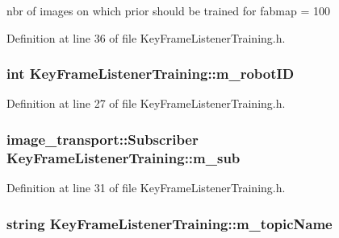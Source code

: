 nbr of images on which prior should be trained for fabmap = 100 



\-Definition at line 36 of file \-Key\-Frame\-Listener\-Training.\-h.

\hypertarget{classKeyFrameListenerTraining_ac4bc91c462f7cbf1364087c8c7177ee5}{
\subsubsection[{m\-\_\-robot\-I\-D}]{\setlength{\rightskip}{0pt plus 5cm}int {\bf \-Key\-Frame\-Listener\-Training\-::m\-\_\-robot\-I\-D}}}\label{classKeyFrameListenerTraining_ac4bc91c462f7cbf1364087c8c7177ee5}


\-Definition at line 27 of file \-Key\-Frame\-Listener\-Training.\-h.

\hypertarget{classKeyFrameListenerTraining_a3b368cdbbe4bbb92bf47a35d01d55644}{
\subsubsection[{m\-\_\-sub}]{\setlength{\rightskip}{0pt plus 5cm}image\-\_\-transport\-::\-Subscriber {\bf \-Key\-Frame\-Listener\-Training\-::m\-\_\-sub}}}\label{classKeyFrameListenerTraining_a3b368cdbbe4bbb92bf47a35d01d55644}


\-Definition at line 31 of file \-Key\-Frame\-Listener\-Training.\-h.

\hypertarget{classKeyFrameListenerTraining_aa6e0e60a43e678d54a90201c9ec34deb}{
\subsubsection[{m\-\_\-topic\-Name}]{\setlength{\rightskip}{0pt plus 5cm}string {\bf \-Key\-Frame\-Listener\-Training\-::m\-\_\-topic\-Name}}}\label{classKeyFrameListenerTraining_aa6e0e60a43e678d54a90201c9ec34deb}



